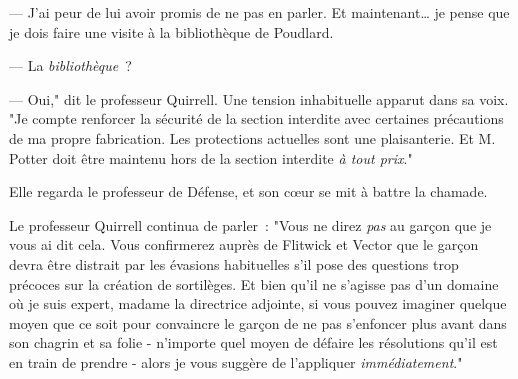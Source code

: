 --- J'ai peur de lui avoir promis de ne pas en parler. Et maintenant… je pense que je dois faire une visite à la bibliothèque de Poudlard.

--- La \emph{bibliothèque}~?

--- Oui," dit le professeur Quirrell. Une tension inhabituelle apparut dans sa voix. "Je compte renforcer la sécurité de la section interdite avec certaines précautions de ma propre fabrication. Les protections actuelles sont une plaisanterie. Et M. Potter doit être maintenu hors de la section interdite \emph{à tout prix}."

Elle regarda le professeur de Défense, et son cœur se mit à battre la chamade.

Le professeur Quirrell continua de parler~: "Vous ne direz \emph{pas} au garçon que je vous ai dit cela. Vous confirmerez auprès de Flitwick et Vector que le garçon devra être distrait par les évasions habituelles s'il pose des questions trop précoces sur la création de sortilèges. Et bien qu'il ne s'agisse pas d'un domaine où je suis expert, madame la directrice adjointe, si vous pouvez imaginer quelque moyen que ce soit pour convaincre le garçon de ne pas s'enfoncer plus avant dans son chagrin et sa folie - n'importe quel moyen de défaire les résolutions qu'il est en train de prendre - alors je vous suggère de l'appliquer \emph{immédiatement}." 
